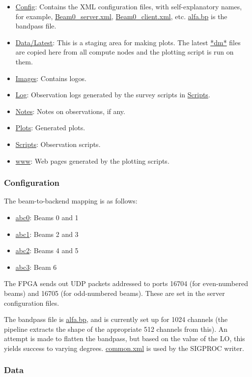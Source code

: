 \documentclass{article}
\begin{document}
\begin{itemize}
\item \url{Config}: Contains the XML configuration files, with self-explanatory
names, for example, \url{Beam0_server.xml}, \url{Beam0_client.xml}, etc.
\url{alfa.bp} is the bandpass file.
\item \url{Data/Latest}: This is a staging area for making plots. The latest
\url{*dm*} files are copied here from all compute nodes and the plotting script
is run on them.
\item \url{Images}: Contains logos.
\item \url{Log}: Observation logs generated by the survey scripts in
\url{Scripts}.
\item \url{Notes}: Notes on observations, if any.
\item \url{Plots}: Generated plots.
\item \url{Scripts}: Observation scripts.
\item \url{www}: Web pages generated by the plotting scripts.
\end{itemize}


\subsubsection{Configuration}

The beam-to-backend mapping is as follows:

\begin{itemize}
\item \url{abc0}: Beams 0 and 1
\item \url{abc1}: Beams 2 and 3
\item \url{abc2}: Beams 4 and 5
\item \url{abc3}: Beam 6
\end{itemize}

The FPGA sends out UDP packets addressed to ports 16704 (for even-numbered
beams) and 16705 (for odd-numbered beams). These are set in the server
configuration files.

The bandpass file is \url{alfa.bp}, and is currently set up for 1024 channels
(the pipeline extracts the shape of the appropriate 512 channels from this). An
attempt is made to flatten the bandpass, but based on the value of the LO, this
yields success to varying degrees. \url{common.xml} is used by the SIGPROC
writer.


\subsubsection{Data}
\end{document}
